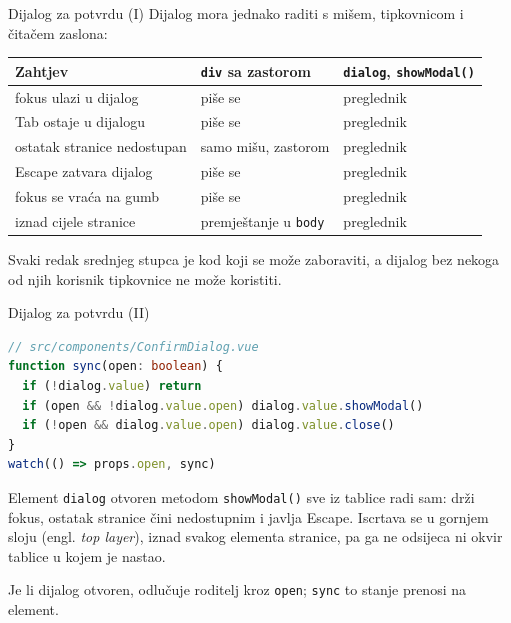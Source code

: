 \begin{frame}{Dijalog za potvrdu (I)}
Dijalog mora jednako raditi s mišem, tipkovnicom i čitačem zaslona:

\vspace{0.5em}
\begin{center}
{\small
\setlength{\tabcolsep}{6pt}
\renewcommand{\arraystretch}{1.3}
\begin{tabular}{@{}L{4.7cm}L{3.4cm}L{3.8cm}@{}}
  \toprule
  \textbf{Zahtjev} & \texttt{div} \textbf{sa zastorom} & \texttt{dialog}, \texttt{showModal()} \\
  \midrule
  fokus ulazi u dijalog & piše se & preglednik \\
  Tab ostaje u dijalogu & piše se & preglednik \\
  ostatak stranice nedostupan & samo mišu, zastorom & preglednik \\
  Escape zatvara dijalog & piše se & preglednik \\
  fokus se vraća na gumb & piše se & preglednik \\
  iznad cijele stranice & premještanje u \texttt{body} & preglednik \\
  \bottomrule
\end{tabular}
}
\end{center}

\vspace{0.5em}
Svaki redak srednjeg stupca je kod koji se može zaboraviti, a dijalog bez nekoga od njih korisnik tipkovnice ne može koristiti.
\end{frame}

\begin{frame}[fragile]{Dijalog za potvrdu (II)}
\begin{lstlisting}[language=typescript]
// src/components/ConfirmDialog.vue
function sync(open: boolean) {
  if (!dialog.value) return
  if (open && !dialog.value.open) dialog.value.showModal()
  if (!open && dialog.value.open) dialog.value.close()
}
watch(() => props.open, sync)
\end{lstlisting}

\vspace{0.3em}
Element \texttt{dialog} otvoren metodom \texttt{showModal()} sve iz tablice radi sam: drži fokus, ostatak stranice čini nedostupnim i javlja Escape. Iscrtava se u gornjem sloju (engl. \emph{top layer}), iznad svakog elementa stranice, pa ga ne odsijeca ni okvir tablice u kojem je nastao.

\vspace{0.3em}
Je li dijalog otvoren, odlučuje roditelj kroz \texttt{open}; \texttt{sync} to stanje prenosi na element.
\end{frame}

